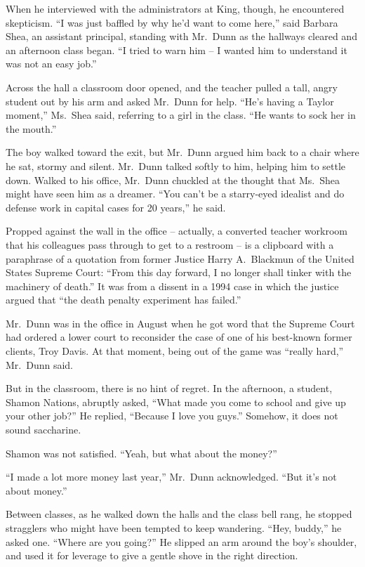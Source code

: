 ﻿\documentclass[12pt]{article}
\begin{document}
When he interviewed with the administrators at King, though, he encountered skepticism. ``I was just
baffled by why he'd want to come here,'' said Barbara Shea, an assistant principal, standing with
Mr.~Dunn as the hallways cleared and an afternoon class began. ``I tried to warn him -- I wanted him
to understand it was not an easy job.''

Across the hall a classroom door opened, and the teacher pulled a tall, angry student out by his arm
and asked Mr.~Dunn for help. ``He's having a Taylor moment,'' Ms.~Shea said, referring to a girl in
the class. ``He wants to sock her in the mouth.''

The boy walked toward the exit, but Mr.~Dunn argued him back to a chair where he sat, stormy and
silent. Mr.~Dunn talked softly to him, helping him to settle down. Walked to his office, Mr.~Dunn
chuckled at the thought that Ms.~Shea might have seen him as a dreamer. ``You can't be a starry-eyed
idealist and do defense work in capital cases for 20 years,'' he said.

Propped against the wall in the office -- actually, a converted teacher workroom that his colleagues
pass through to get to a restroom -- is a clipboard with a paraphrase of a quotation from former
Justice Harry A.~Blackmun of the United States Supreme Court: ``From this day forward, I no longer
shall tinker with the machinery of death.'' It was from a dissent in a 1994 case in which the
justice argued that ``the death penalty experiment has failed.''

Mr.~Dunn was in the office in August when he got word that the Supreme Court had ordered a lower
court to reconsider the case of one of his best-known former clients, Troy Davis. At that moment,
being out of the game was ``really hard,'' Mr.~Dunn said.

But in the classroom, there is no hint of regret. In the afternoon, a student, Shamon Nations,
abruptly asked, ``What made you come to school and give up your other job?'' He replied, ``Because I
love you guys.'' Somehow, it does not sound saccharine.

Shamon was not satisfied. ``Yeah, but what about the money?''

``I made a lot more money last year,'' Mr.~Dunn acknowledged. ``But it's not about money.''

Between classes, as he walked down the halls and the class bell rang, he stopped stragglers who
might have been tempted to keep wandering. ``Hey, buddy,'' he asked one. ``Where are you going?'' He
slipped an arm around the boy's shoulder, and used it for leverage to give a gentle shove in the
right direction.
\end{document}
